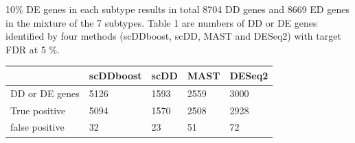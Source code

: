 \documentclass[11pt]{amsart}
\begin{document}
10\% DE genes in each subtype results in total 8704 DD genes and 8669 ED genes in the mixture of the 7 subtypes.
Table 1 are numbers of DD or DE genes identified by four methods (scDDboost, scDD, MAST and DESeq2) with target FDR at 5 \%. 
\begin{table}
\centering
\begin{tabular}{ |p{3cm}|p{2cm}|p{2cm}|p{2cm}|p{2cm}|}
\hline
 & scDDboost & scDD & MAST & DESeq2\\
\hline
\hline
DD or DE genes & 5126 & 1593 & 2559 & 3000\\
\hline
True positive & 5094 & 1570 & 2508 & 2928\\
\hline
false positive & 32 & 23 & 51 & 72\\
\hline
\end{tabular}
\end{table}
\end{document}
